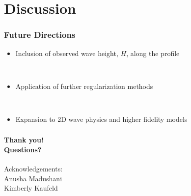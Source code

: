 \documentclass[7pt]{beamer}
\begin{document}
\section{Discussion}

\begin{frame}
	\frametitle{Future Directions}
		\begin{itemize}
			 \item Inclusion of observed wave height, $H$, along the profile
		\end{itemize}
		$\,$\\
		\begin{itemize}
			 \item Application of further regularization methods
		\end{itemize}
		$\,$\\
		\begin{itemize}
			 \item Expansion to 2D wave physics and higher fidelity models
		\end{itemize}
\end{frame}

\begin{frame}
	\frametitle{}
		\hspace{2.5cm}
		\begin{minipage}{50mm}   
                 	\begin{alertblock}{}    
                        		 \begin{center}
                  			\textbf{Thank you! \\Questions?}\\
					$\,$\\
					Acknowledgements:\\
					Anusha Madushani\\
					Kimberly Kaufeld
                            	 \end{center}
      			\end{alertblock}
		\end{minipage}
\end{frame}
\end{document}
